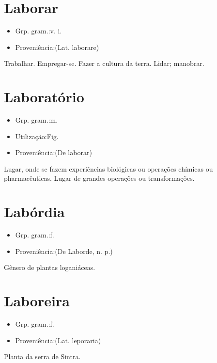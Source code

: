 \section{Laborar}
\begin{itemize}
\item {Grp. gram.:v. i.}
\end{itemize}
\begin{itemize}
\item {Proveniência:(Lat. \textunderscore laborare\textunderscore )}
\end{itemize}
Trabalhar.
Empregar-se.
Fazer a cultura da terra.
Lidar; manobrar.
\section{Laboratório}
\begin{itemize}
\item {Grp. gram.:m.}
\end{itemize}
\begin{itemize}
\item {Utilização:Fig.}
\end{itemize}
\begin{itemize}
\item {Proveniência:(De \textunderscore laborar\textunderscore )}
\end{itemize}
Lugar, onde se fazem experiências biológicas ou operações chímicas ou pharmacêuticas.
Lugar de grandes operações ou transformações.
\section{Labórdia}
\begin{itemize}
\item {Grp. gram.:f.}
\end{itemize}
\begin{itemize}
\item {Proveniência:(De \textunderscore Laborde\textunderscore , n. p.)}
\end{itemize}
Gênero de plantas loganiáceas.
\section{Laboreira}
\begin{itemize}
\item {Grp. gram.:f.}
\end{itemize}
\begin{itemize}
\item {Proveniência:(Lat. \textunderscore leporaria\textunderscore )}
\end{itemize}
Planta da serra de Sintra.
